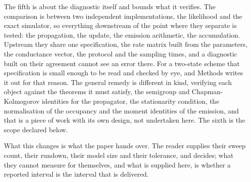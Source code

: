 The fifth is about the diagnostic itself and bounds what it verifies. The comparison is between two
independent implementations, the likelihood and the exact simulator, so everything downstream of the
point where they separate is tested: the propagation, the update, the emission arithmetic, the
accumulation. Upstream they share one specification, the rate matrix built from the parameters, the
conductance vector, the protocol and the sampling times, and a diagnostic built on their agreement
cannot see an error there. For a two-state scheme that specification is small enough to be read and
checked by eye, and Methods writes it out for that reason. The general remedy is different in kind,
verifying each object against the theorems it must satisfy, the semigroup and Chapman-Kolmogorov
identities for the propagator, the stationarity condition, the normalisation of the occupancy and the
moment identities of the emission, and that is a piece of work with its own design, not undertaken
here. The sixth is the scope declared below.

What this changes is what the paper hands over. The reader supplies their sweep count, their rundown,
their model size and their tolerance, and decides; what they cannot measure for themselves, and what
is supplied here, is whether a reported interval is the interval that is delivered.

